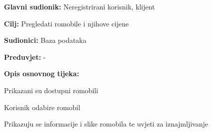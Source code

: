 					\noindent {}
					\begin{packed_item}
	
						\item \textbf{Glavni sudionik: }Neregistrirani korisnik, klijent
						\item  \textbf{Cilj: }Pregledati romobile i njihove cijene
						\item  \textbf{Sudionici: }Baza podataka
						\item  \textbf{Preduvjet: }-
						\item  \textbf{Opis osnovnog tijeka:}
						
						\item[] \begin{packed_enum}
	
							\item Prikazani su dostupni romobili
							\item Korisnik odabire romobil
							\item Prikazuju se informacije i slike romobila te uvjeti za iznajmljivanje

						\end{packed_enum}
					\end{packed_item}
						
					

